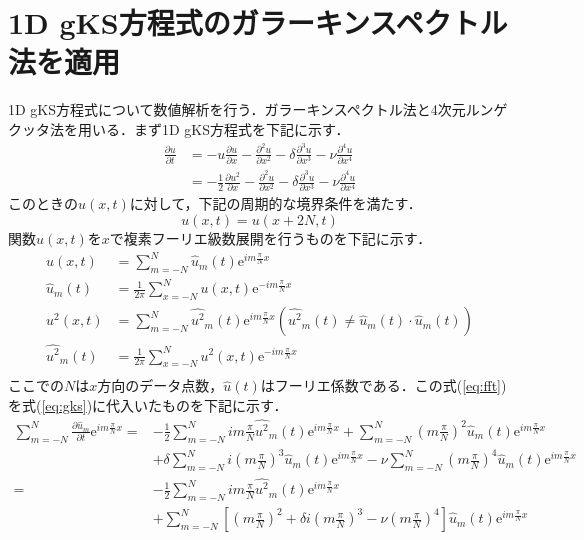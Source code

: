 \documentclass[autodetect-engine,dvipdfmx-if-dvi,ja=standard,a4paper,11pt]{bxjsarticle} %
\begin{document}
\section{1D gKS方程式のガラーキンスペクトル法を適用}
1D gKS方程式について数値解析を行う．ガラーキンスペクトル法と4次元ルンゲクッタ法を用いる．まず1D gKS方程式を下記に示す．
\begin{equation}
\begin{split}
\frac{\partial u}{\partial t}&=-u\frac{\partial u}{\partial x}-\frac{\partial^2 u}{\partial x^2}-\delta\frac{\partial^3 u}{\partial x^3}-\nu\frac{\partial^4 u}{\partial x^4}\\
&=-\frac{1}{2}\frac{\partial u^2}{\partial x}-\frac{\partial^2 u}{\partial x^2}-\delta\frac{\partial^3 u}{\partial x^3}-\nu\frac{\partial^4 u}{\partial x^4}
\label{eq:gks}
\end{split}
\end{equation}
このときの$u(x,t)$に対して，下記の周期的な境界条件を満たす．
\begin{equation}
u(x,t)=u(x+2N,t)
\label{eq:bcf}
\end{equation}
関数$u(x,t)$を$x$で複素フーリエ級数展開を行うものを下記に示す．
\begin{subequations}
\begin{align}
u(x,t)&=\displaystyle\sum_{m=-N}^N\hat{u}_m(t) \mathrm{e}^{im\frac{\pi}{N}x}\label{eq:fft}\\
\hat{u}_m(t)&=\frac{1}{2\pi}\displaystyle\sum_{x=-N}^Nu(x,t) \mathrm{e}^{-im\frac{\pi}{N}x}\label{eq:ifft}\\
u^2(x,t)&=\displaystyle\sum_{m=-N}^N\hat{u^2}_m(t) \mathrm{e}^{im\frac{\pi}{N}x}\left(\hat{u^2}_m(t)\neq\hat{u}_m(t)\cdot\hat{u}_m(t)\right)\label{eq:fft2}\\
\hat{u^2}_m(t)&=\frac{1}{2\pi}\displaystyle\sum_{x=-N}^Nu^2(x,t) \mathrm{e}^{-im\frac{\pi}{N}x}\label{eq:ifft2}\\
\end{align}
\label{eq:fftall}
\end{subequations}
ここでの$N$は$x$方向のデータ点数，$\hat{u}(t)$はフーリエ係数である．この式(\ref{eq:fft})を式(\ref{eq:gks})に代入いたものを下記に示す．
\begin{equation}
\begin{split}
\displaystyle\sum_{m=-N}^N\frac{\partial \hat{u}_m}{\partial t} \mathrm{e}^{im\frac{\pi}{N}x}=&-\frac{1}{2}\displaystyle\sum_{m=-N}^Nim\frac{\pi}{N}\hat{u^2}_m(t) \mathrm{e}^{im\frac{\pi}{N}x}+\displaystyle\sum_{m=-N}^N\left(m\frac{\pi}{N}\right)^2\hat{u}_m(t) \mathrm{e}^{im\frac{\pi}{N}x}\\
&+\delta\displaystyle\sum_{m=-N}^Ni\left(m\frac{\pi}{N}\right)^3\hat{u}_m(t) \mathrm{e}^{im\frac{\pi}{N}x}-\nu\displaystyle\sum_{m=-N}^N\left(m\frac{\pi}{N}\right)^4\hat{u}_m(t) \mathrm{e}^{im\frac{\pi}{N}x}\\
=&-\frac{1}{2}\displaystyle\sum_{m=-N}^Nim\frac{\pi}{N}\hat{u^2}_m(t) \mathrm{e}^{im\frac{\pi}{N}x}\\
&+\displaystyle\sum_{m=-N}^N\left[\left(m\frac{\pi}{N}\right)^2+\delta i\left(m\frac{\pi}{N}\right)^3-\nu \left(m\frac{\pi}{N}\right)^4\right]\hat{u}_m(t) \mathrm{e}^{im\frac{\pi}{N}x}
\label{eq:gksfft}
\end{split}
\end{equation}
\end{document}
